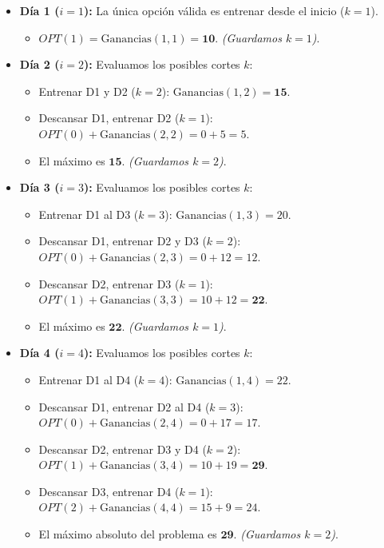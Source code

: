 \begin{itemize}
    \item \textbf{Día 1 ($i=1$):} 
    La única opción válida es entrenar desde el inicio ($k=1$).
    \begin{itemize}
        \item $OPT(1) = \text{Ganancias}(1, 1) = \mathbf{10}$. \textit{(Guardamos $k=1$)}.
    \end{itemize}

    \item \textbf{Día 2 ($i=2$):} 
    Evaluamos los posibles cortes $k$:
    \begin{itemize}
        \item Entrenar D1 y D2 ($k=2$): $\text{Ganancias}(1, 2) = \mathbf{15}$.
        \item Descansar D1, entrenar D2 ($k=1$): $OPT(0) + \text{Ganancias}(2, 2) = 0 + 5 = 5$.
        \item El máximo es $\mathbf{15}$. \textit{(Guardamos $k=2$)}.
    \end{itemize}

    \item \textbf{Día 3 ($i=3$):} 
    Evaluamos los posibles cortes $k$:
    \begin{itemize}
        \item Entrenar D1 al D3 ($k=3$): $\text{Ganancias}(1, 3) = 20$.
        \item Descansar D1, entrenar D2 y D3 ($k=2$): $OPT(0) + \text{Ganancias}(2, 3) = 0 + 12 = 12$.
        \item Descansar D2, entrenar D3 ($k=1$): $OPT(1) + \text{Ganancias}(3, 3) = 10 + 12 = \mathbf{22}$.
        \item El máximo es $\mathbf{22}$. \textit{(Guardamos $k=1$)}.
    \end{itemize}

    \item \textbf{Día 4 ($i=4$):} 
    Evaluamos los posibles cortes $k$:
    \begin{itemize}
        \item Entrenar D1 al D4 ($k=4$): $\text{Ganancias}(1, 4) = 22$.
        \item Descansar D1, entrenar D2 al D4 ($k=3$): $OPT(0) + \text{Ganancias}(2, 4) = 0 + 17 = 17$.
        \item Descansar D2, entrenar D3 y D4 ($k=2$): $OPT(1) + \text{Ganancias}(3, 4) = 10 + 19 = \mathbf{29}$.
        \item Descansar D3, entrenar D4 ($k=1$): $OPT(2) + \text{Ganancias}(4, 4) = 15 + 9 = 24$.
        \item El máximo absoluto del problema es $\mathbf{29}$. \textit{(Guardamos $k=2$)}.
    \end{itemize}
\end{itemize}

